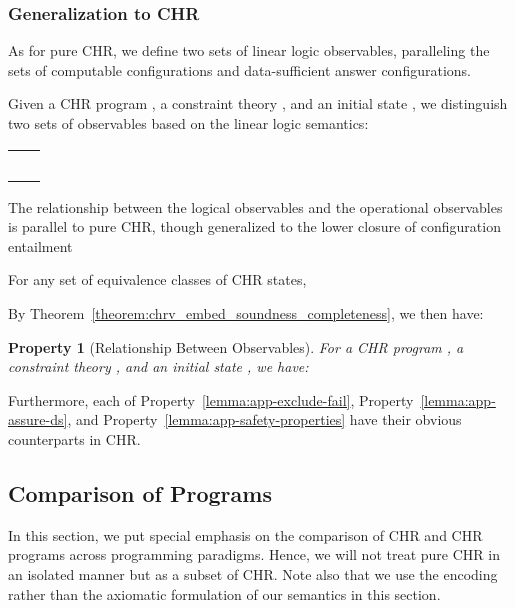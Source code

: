\documentclass[acmtocl]{acmtrans2m}
\newtheorem{property}[theorem]{Property}
\begin{document}
\subsubsection{Generalization to CHR}

As for pure CHR, we define two sets of linear logic observables, paralleling
the sets of computable configurations and data-sufficient answer configurations.

\begin{definition}
Given a CHR program , a constraint theory , and an initial
state , we distinguish two sets of observables based on the linear logic
semantics:

\begin{tabular}{r @{\,} l}
	\multicolumn{2}{c}{}\\
	 &
		\\
	 &
		 \\
	\multicolumn{1}{c}{} & \quad
		\\
	\multicolumn{2}{c}{}\\
\end{tabular}
\end{definition}

The relationship between the
logical observables and the operational
observables is parallel to pure CHR, though generalized to the
lower closure of configuration entailment

\begin{definition}
For any set  of equivalence classes of CHR states,

\end{definition}

By Theorem~\ref{theorem:chrv_embed_soundness_completeness}, we then have:

\begin{property}[Relationship Between Observables]
For a CHR program , a constraint theory , and an initial
state , we have:

\end{property}

Furthermore, each of Property~\ref{lemma:app-exclude-fail},
Property~\ref{lemma:app-assure-ds}, and
Property~\ref{lemma:app-safety-properties} have their obvious
counterparts in CHR.

\subsection{Comparison of Programs}
\label{sec:app:comparison}

In this section, we put special emphasis on the comparison of CHR and CHR
programs across programming paradigms. Hence, we will not treat pure CHR in an
isolated manner but as a subset of CHR. Note also that we use the
encoding rather than the axiomatic formulation of our semantics in this section.
\end{document}

